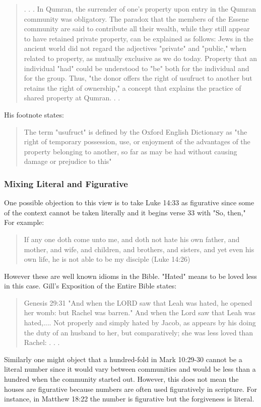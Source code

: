 \documentclass[11pt]{article}
\begin{document}
\begin{quote}
. . . In Qumran, the surrender of one's property upon entry in the Qumran community was obligatory. The paradox that the members of the Essene community are said to contribute all their wealth, while they still appear to have retained private property, can be explained as follows: Jews in the ancient world did not regard the adjectives "private" and "public," when related to property, as mutually exclusive as we do today. Property that an individual "had" could be understood to "be" both for the individual and for the group. Thus, "the donor offers the right of usufruct to another but retains the right of ownership," a concept that explains the practice of shared property at Qumran. . . \cite{usufruct Schnabel} 
\end{quote}
His footnote states:
\begin{quote}
The term "usufruct" is defined by the Oxford English Dictionary as "the right of temporary possession, use, or enjoyment of the advantages of the property belonging to another, so far as may be had without causing damage or prejudice to this" \cite{usufruct Schnabel}
\end{quote}


\subsubsection{Mixing Literal and Figurative}
One possible objection to this view is to take Luke 14:33 as figurative since some of the context cannot be taken literally and it begins verse 33 with "So, then," For example: 
\begin{quote}
If any one doth come unto me, and doth not hate his own father, and mother, and wife, and children, and brothers, and sisters, and yet even his own life, he is not able to be my disciple (Luke 14:26)
\end{quote}
 However these are well known idioms in the Bible. "Hated" means to be loved less in this case. \cite{hate means love less} 
Gill's Exposition of the Entire Bible states:
\begin{quote}
Genesis 29:31
"And when the LORD saw that Leah was hated, he opened her womb: but Rachel was barren."
And when the Lord saw that Leah was hated,.... Not properly and simply hated by Jacob, as appears by his doing the duty of an husband to her, but comparatively; she was less loved than Rachel: . . .
\end{quote}
Similarly one might object that a hundred-fold in Mark 10:29-30 cannot be a literal number since it would vary between communities and would be less than a hundred when the community started out. However, this does not mean the houses are figurative because numbers are often used figuratively in scripture. For instance, in Matthew 18:22 the number is figurative but the forgiveness is literal.
\end{document}
